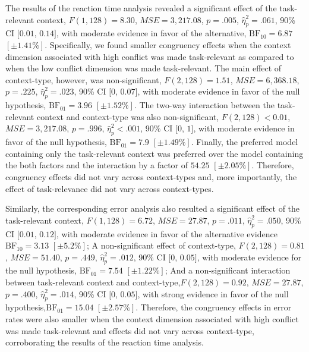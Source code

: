 \documentclass[english,,man,floatsintext]{apa6}
\begin{document}
The results of the reaction time analysis revealed a significant effect of the task-relevant context, \(F(1, 128) = 8.30\), \(\mathit{MSE} = 3,217.08\), \(p = .005\), \(\hat{\eta}^2_p = .061\), 90\% CI \([0.01\), \(0.14]\), with moderate evidence in favor of the alternative, \(\mathrm{BF}_{\textrm{10}} = 6.87\) \([\pm 1.41\%]\). Specifically, we found smaller congruency effects when the context dimension associated with high conflict was made task-relevant as compared to when the low conflict dimension was made task-relevant. The main effect of context-type, however, was non-significant, \(F(2, 128) = 1.51\), \(\mathit{MSE} = 6,368.18\), \(p = .225\), \(\hat{\eta}^2_p = .023\), 90\% CI \([0\), \(0.07]\), with moderate evidence in favor of the null hypothesis, \(\mathrm{BF}_{\textrm{01}} = 3.96\) \([\pm 1.52\%]\). The two-way interaction between the task-relevant context and context-type was also non-significant, \(F(2, 128) < 0.01\), \(\mathit{MSE} = 3,217.08\), \(p = .996\), \(\hat{\eta}^2_p < .001\), 90\% CI \([0\), \(1]\), with moderate evidence in favor of the null hypothesis, \(\mathrm{BF}_{\textrm{01}} = 7.9\) \([\pm 1.49\%]\). Finally, the preferred model containing only the task-relevant context was preferred over the model containing the both factors and the interaction by a factor of \(54.25\) \([\pm 2.05\%]\). Therefore, congruency effects did not vary across context-types and, more importantly, the effect of task-relevance did not vary across context-types.

Similarly, the corresponding error analysis also resulted a significant effect of the task-relevant context, \(F(1, 128) = 6.72\), \(\mathit{MSE} = 27.87\), \(p = .011\), \(\hat{\eta}^2_p = .050\), 90\% CI \([0.01\), \(0.12]\), with moderate evidence in favor of the alternative evidence \(\mathrm{BF}_{\textrm{10}} = 3.13\) \([\pm 5.2\%]\); A non-significant effect of context-type, \(F(2, 128) = 0.81\), \(\mathit{MSE} = 51.40\), \(p = .449\), \(\hat{\eta}^2_p = .012\), 90\% CI \([0\), \(0.05]\), with moderate evidence for the null hypothesis, \(\mathrm{BF}_{\textrm{01}} = 7.54\) \([\pm 1.22\%]\); And a non-significant interaction between task-relevant context and context-type,\(F(2, 128) = 0.92\), \(\mathit{MSE} = 27.87\), \(p = .400\), \(\hat{\eta}^2_p = .014\), 90\% CI \([0\), \(0.05]\), with strong evidence in favor of the null hypothesis,\(\mathrm{BF}_{\textrm{01}} = 15.04\) \([\pm 2.57\%]\). Therefore, the congruency effects in error rates were also smaller when the context dimension associated with high conflict was made task-relevant and effects did not vary across context-type, corroborating the results of the reaction time analysis.
\end{document}
